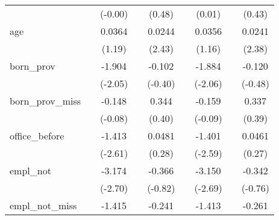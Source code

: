 {\begin{tabular}{l*{8}{c}}
            &                     &     (-0.00)         &                     &      (0.48)         &                     &      (0.01)         &                     &      (0.43)         \\
[1em]
age         &                     &      0.0364         &                     &      0.0244\sym{*}  &                     &      0.0356         &                     &      0.0241\sym{*}  \\
            &                     &      (1.19)         &                     &      (2.43)         &                     &      (1.16)         &                     &      (2.38)         \\
[1em]
born\_prov   &                     &      -1.904\sym{*}  &                     &      -0.102         &                     &      -1.884\sym{*}  &                     &      -0.120         \\
            &                     &     (-2.05)         &                     &     (-0.40)         &                     &     (-2.06)         &                     &     (-0.48)         \\
[1em]
born\_prov\_miss&                     &      -0.148         &                     &       0.344         &                     &      -0.159         &                     &       0.337         \\
            &                     &     (-0.08)         &                     &      (0.40)         &                     &     (-0.09)         &                     &      (0.39)         \\
[1em]
office\_before&                     &      -1.413\sym{**} &                     &      0.0481         &                     &      -1.401\sym{**} &                     &      0.0461         \\
            &                     &     (-2.61)         &                     &      (0.28)         &                     &     (-2.59)         &                     &      (0.27)         \\
[1em]
empl\_not    &                     &      -3.174\sym{**} &                     &      -0.366         &                     &      -3.150\sym{**} &                     &      -0.342         \\
            &                     &     (-2.70)         &                     &     (-0.82)         &                     &     (-2.69)         &                     &     (-0.76)         \\
[1em]
empl\_not\_miss&                     &      -1.415         &                     &      -0.241         &                     &      -1.413         &                     &      -0.261         \\

\end{tabular}}
